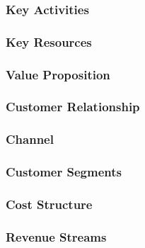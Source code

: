 \documentclass[12pt, a4paper]{article}
\begin{document}
\subsubsection{Key Activities}


\subsubsection{Key Resources}


\subsubsection{Value Proposition}


\subsubsection{Customer Relationship}


\subsubsection{Channel}


\subsubsection{Customer Segments}


\subsubsection{Cost Structure}


\subsubsection{Revenue Streams}
\end{document}

